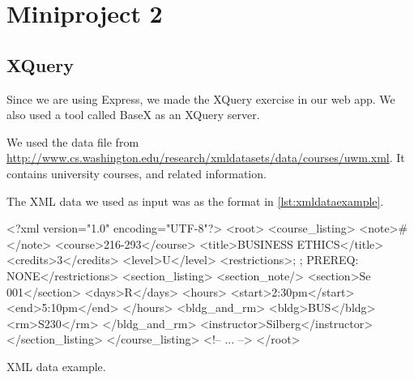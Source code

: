 \chapter{Miniproject 2}
\section{XQuery}

Since we are using Express, we made the XQuery exercise in our web app. We also used a tool called BaseX as an XQuery server.

We used the data file from \url{http://www.cs.washington.edu/research/xmldatasets/data/courses/uwm.xml}.
It contains university courses, and related information.

The XML data we used as input was as the format in \cref{lst:xmldataexample}.

\begin{listing}
    \begin{xmlblock}
        <?xml version="1.0" encoding="UTF-8"?>
        <root>
            <course_listing>
                <note>#</note>
                <course>216-293</course>
                <title>BUSINESS ETHICS</title>
                <credits>3</credits>
                <level>U</level>
                <restrictions>; ; PREREQ: NONE</restrictions>
                <section_listing>
                    <section_note/>
                    <section>Se 001</section>
                    <days>R</days>
                    <hours>
                        <start>2:30pm</start>
                        <end>5:10pm</end>
                    </hours>
                    <bldg_and_rm>
                    <bldg>BUS</bldg>
                    <rm>S230</rm>
                    </bldg_and_rm>
                    <instructor>Silberg</instructor>
                </section_listing>
            </course_listing>
            <!-- ... -->
        </root>
    \end{xmlblock}
    \caption{XML data example.}
    \label{lst:xmldataexample}
\end{listing}

